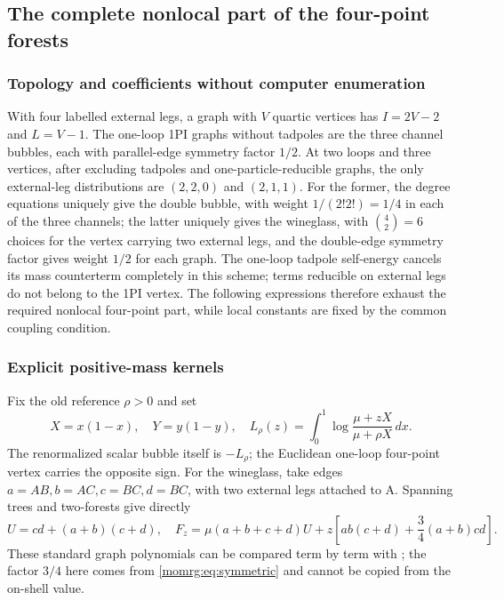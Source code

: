 \documentclass[11pt,a4paper,oneside]{article}
\theoremstyle{plain}
\theoremstyle{definition}
\theoremstyle{remark}
\numberwithin{equation}{section}
\begin{document}
\subsection{The complete nonlocal part of the four-point forests}\label{momrg:sec:forests}
\subsubsection{Topology and coefficients without computer enumeration}
With four labelled external legs, a graph with $V$ quartic vertices has
$I=2V-2$ and $L=V-1$.
The one-loop 1PI graphs without tadpoles are the three channel bubbles, each with parallel-edge symmetry factor $1/2$.
At two loops and three vertices, after excluding tadpoles and one-particle-reducible graphs,
the only external-leg distributions are $(2,2,0)$ and $(2,1,1)$.
For the former, the degree equations uniquely give the double bubble, with weight $1/(2!2!)=1/4$ in each of the three channels;
the latter uniquely gives the wineglass, with $\binom42=6$ choices for the vertex carrying two external legs,
and the double-edge symmetry factor gives weight $1/2$ for each graph.
The one-loop tadpole self-energy cancels its mass counterterm completely in this scheme;
terms reducible on external legs do not belong to the 1PI vertex.
The following expressions therefore exhaust the required nonlocal four-point part, while local constants are fixed by the common coupling condition.

\subsubsection{Explicit positive-mass kernels}
Fix the old reference $\rho>0$ and set
\begin{equation}\label{momrg:eq:one-loop}
 X=x(1-x),\quad Y=y(1-y),\quad
 L_\rho(z)=\int_0^1\log\frac{\mu+zX}{\mu+\rho X}\,dx.
\end{equation}
The renormalized scalar bubble itself is $-L_\rho$; the Euclidean one-loop four-point vertex carries the opposite sign.
For the wineglass, take edges $a=AB,b=AC,c=BC,d=BC$, with two external legs attached to A.
Spanning trees and two-forests give directly
\begin{equation}\label{momrg:eq:wine-polynomial}
 U=cd+(a+b)(c+d),\quad
 F_z=\mu(a+b+c+d)U
       +z\left[ab(c+d)+\frac34(a+b)cd\right].
\end{equation}
These standard graph polynomials can be compared term by term with \cite[Section~5]{bk2012};
the factor $3/4$ here comes from \eqref{momrg:eq:symmetric} and cannot be copied from the on-shell value.
\end{document}

